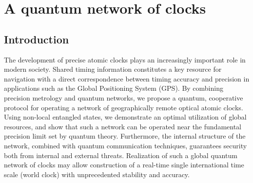 \chapter{A quantum network of clocks}
\label{ch:Komar2014}

\section{Introduction}

The development of precise atomic clocks 
plays an  increasingly important role in  modern
society. Shared timing information constitutes a key resource for  
navigation with a direct correspondence between timing accuracy and
precision in applications such as the Global Positioning System (GPS).
By combining  precision metrology and quantum networks, we propose 
a
quantum, cooperative protocol for operating a network of
geographically remote optical atomic clocks. Using non-local entangled states,
we demonstrate an optimal utilization of 
global 
resources, and show
that such a network can be operated near the fundamental precision limit set by
quantum theory.
Furthermore, the internal structure of the network, combined with 
quantum communication techniques, guarantees security both from internal
and external threats. Realization of such a global quantum network of clocks may
allow construction of a real-time single international time scale (world clock)
with unprecedented stability and accuracy.

